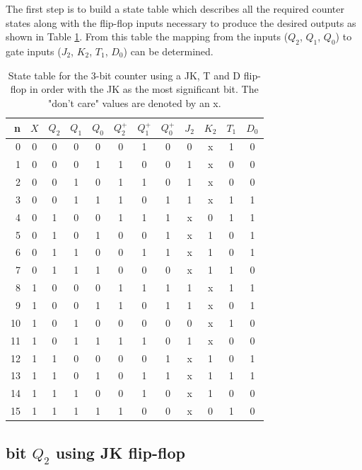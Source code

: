 \documentclass[12pt]{article}
\begin{document}
The first step is to build a state table which describes all
the required counter states along with the flip-flop inputs
necessary to produce the desired outputs as shown in Table \ref{tbl:st}. 
From this table the mapping from the inputs
($Q_2$, $Q_1$, $Q_0$) to gate inputs ($J_2$, $K_2$, $T_1$, $D_0$) can be determined.

\begin{table}
\center
\begin{tabular}[t]{r|cccc|ccc|cc|c|c}
n & $X$ & $Q_2$ & $Q_1$ & $Q_0$ & $Q_2^+$ & $Q_1^+$ & $Q_0^+$ & $J_2$ & $K_2$ & $T_1$ & $D_0$ \\ 
\hline
0 & 0 & 0 & 0 & 0   & 0 & 1 & 0   & 0 & x   & 1   & 0 \\ 
1 & 0 & 0 & 0 & 1   & 1 & 0 & 0   & 1 & x   & 0   & 0 \\ 
2 & 0 & 0 & 1 & 0   & 1 & 1 & 0   & 1 & x   & 0   & 0 \\ 
3 & 0 & 0 & 1 & 1   & 1 & 0 & 1   & 1 & x   & 1   & 1 \\ 
4 & 0 & 1 & 0 & 0   & 1 & 1 & 1   & x & 0   & 1   & 1 \\ 
5 & 0 & 1 & 0 & 1   & 0 & 0 & 1   & x & 1   & 0   & 1 \\ 
6 & 0 & 1 & 1 & 0   & 0 & 1 & 1   & x & 1   & 0   & 1 \\ 
7 & 0 & 1 & 1 & 1   & 0 & 0 & 0   & x & 1   & 1   & 0 \\ 
8 & 1 & 0 & 0 & 0   & 1 & 1 & 1   & 1 & x   & 1   & 1 \\ 
9 & 1 & 0 & 0 & 1   & 1 & 0 & 1   & 1 & x   & 0   & 1 \\ 
10 & 1 & 0 & 1 & 0   & 0 & 0 & 0   & 0 & x   & 1   & 0 \\ 
11 & 1 & 0 & 1 & 1   & 1 & 1 & 0   & 1 & x   & 0   & 0 \\ 
12 & 1 & 1 & 0 & 0   & 0 & 0 & 1   & x & 1   & 0   & 1 \\ 
13 & 1 & 1 & 0 & 1   & 0 & 1 & 1   & x & 1   & 1   & 1 \\ 
14 & 1 & 1 & 1 & 0   & 0 & 1 & 0   & x & 1   & 0   & 0 \\ 
15 & 1 & 1 & 1 & 1   & 1 & 0 & 0   & x & 0   & 1   & 0 \\ 
\end{tabular}
\caption{State table for  the 3-bit counter using a JK,
T and D flip-flop in order with the JK as the most significant bit.
The "don't care" values are denoted by an x.}
\label{tbl:st}
\end{table}

\subsection{bit $Q_2$ using JK flip-flop}
\end{document}
